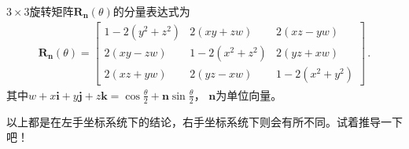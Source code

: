 \begin{corollary}
    $3\times3$旋转矩阵$\bm R_{\bm n}(\theta)$的分量表达式为
    \begin{align}
        \bm R_{\bm n}(\theta)=\left[\begin{array}{ccc}
                1-2(y^2+z^2) & 2(xy+zw)     & 2(xz-yw)     \\
                2(xy-zw)     & 1-2(x^2+z^2) & 2(yz+xw)     \\
                2(xz+yw)     & 2(yz-xw)     & 1-2(x^2+y^2)
            \end{array}\right]\, .
    \end{align}
    其中$\displaystyle w+x\mathbf{i}+y\mathbf{j}+z\mathbf{k}=\cos\frac{\theta}{2}+\bm n\sin\frac{\theta}{2}$，
    $\bm n$为单位向量。
\end{corollary}

\begin{remark}
    以上都是在左手坐标系统下的结论，右手坐标系统下则会有所不同。试着推导一下吧！
\end{remark}

